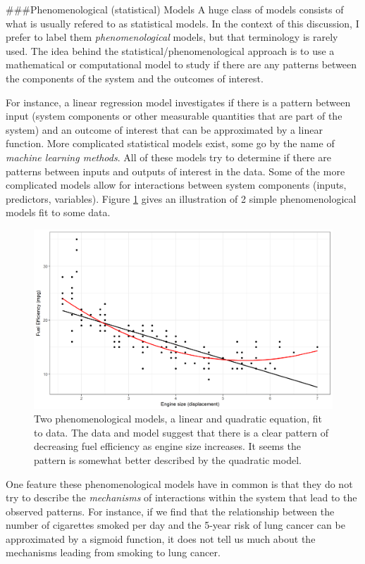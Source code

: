 \documentclass[]{book}
\theoremstyle{definition}
\theoremstyle{definition}
\theoremstyle{definition}
\theoremstyle{remark}
\begin{document}
\#\#\#Phenomenological (statistical) Models A huge class of models
consists of what is usually refered to as statistical models. In the
context of this discussion, I prefer to label them
\emph{phenomenological} models, but that terminology is rarely used. The
idea behind the statistical/phenomenological approach is to use a
mathematical or computational model to study if there are any patterns
between the components of the system and the outcomes of interest.

For instance, a linear regression model investigates if there is a
pattern between input (system components or other measurable quantities
that are part of the system) and an outcome of interest that can be
approximated by a linear function. More complicated statistical models
exist, some go by the name of \emph{machine learning methods}. All of
these models try to determine if there are patterns between inputs and
outputs of interest in the data. Some of the more complicated models
allow for interactions between system components (inputs, predictors,
variables). Figure \ref{fig:phenomodel} gives an illustration of 2
simple phenomenological models fit to some data.

\begin{figure}
\centering
\includegraphics{./images/phenomodel.png}
\caption{\label{fig:phenomodel}Two phenomenological models, a linear and
quadratic equation, fit to data. The data and model suggest that there
is a clear pattern of decreasing fuel efficiency as engine size
increases. It seems the pattern is somewhat better described by the
quadratic model.}
\end{figure}

One feature these phenomenological models have in common is that they do
not try to describe the \emph{mechanisms} of interactions within the
system that lead to the observed patterns. For instance, if we find that
the relationship between the number of cigarettes smoked per day and the
5-year risk of lung cancer can be approximated by a sigmoid function, it
does not tell us much about the mechanisms leading from smoking to lung
cancer.
\end{document}
